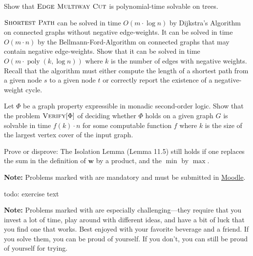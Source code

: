 \documentclass{uebung_cs}
\begin{document}
\begin{exercise}
Show that $\textsc{Edge Multiway Cut}$ is polynomial-time solvable on trees.
\end{exercise}

\begin{exercise}
$\textsc{Shortest Path}$ can be solved in time $O(m\cdot \log n)$ by Dijkstra's Algorithm on connected graphs without negative edge-weights. It can be solved in time $O(m \cdot n)$ by the Bellmann-Ford-Algorithm on connected graphs that may contain negative edge-weights. Show that it can be solved in time $O(m\cdot \operatorname{poly}(k,\log n))$ where $k$ is the number of edges with negative weights. Recall that the algorithm must either compute the length of a shortest path from a given node $s$ to a given node $t$ or correctly report the existence of a negative-weight cycle.
\end{exercise}

\begin{exercise}
Let $\Phi$ be a graph property expressible in monadic second-order logic. Show that the problem $\textsc{Verify}[\Phi]$ of deciding whether $\Phi$ holds on a given graph $G$ is solvable in time $f(k)\cdot n$ for some computable function $f$ where $k$ is the size of the largest vertex cover of the input graph.
\end{exercise}

\begin{exercise}
Prove or disprove:
The Isolation Lemma (Lemma 11.5) still holds if one replaces the sum in the definition of $\textbf{w}$ by a product,
and the $\min$ by $\max$.
\end{exercise}


\textbf{Note:} Problems marked with \mandatory are mandatory and must be submitted in \href{https://moodle.studiumdigitale.uni-frankfurt.de/moodle/course/view.php?id=6259}{Moodle}.

\begin{exercise}
  todo: exercise text
\end{exercise}

\textbf{Note:} Problems marked with \hard are especially challenging---they require that you invest a lot of time, play around with different ideas, and have a bit of luck that you find one that works. Best enjoyed with your favorite beverage and a friend. If you solve them, you can be proud of yourself. If you don't, you can still be proud of yourself for trying.
\end{document}
